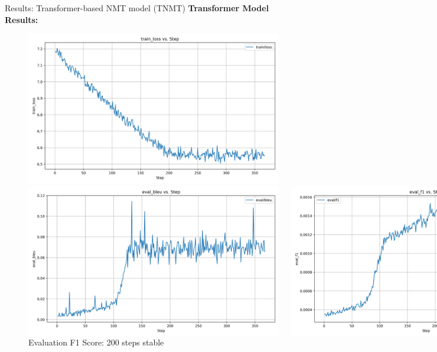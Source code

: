 \documentclass[aspectratio=169]{beamer}
\begin{document}
\begin{frame}{Results: Transformer-based NMT model (TNMT)}
  \textbf{Transformer Model Results:}
  \begin{figure}
    \centering
    \includegraphics[width=0.25\linewidth]{Transformer_train_loss.png}
    \caption{\small Training Loss: 200 steps stable}
    \vspace{1em}

    \begin{columns}[c]
      \centering
      \includegraphics[width=0.55\linewidth]{Transformer_eval_bleu.png}
      \caption{\small Evaluation BLEU Score: 130 steps stable}

      \centering
      \includegraphics[width=0.55\linewidth]{Transformer_eval_f1.png}
      \caption{\small Evaluation F1 Score: 200 steps stable}
    \end{columns}
  \end{figure}
\end{frame}
\end{document}
